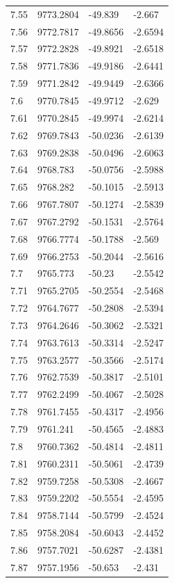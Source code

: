 \begin{table}[H]
\begin{tabular}{llll}
7.55 & 9773.2804 & -49.839 & -2.667 \\
7.56 & 9772.7817 & -49.8656 & -2.6594 \\
7.57 & 9772.2828 & -49.8921 & -2.6518 \\
7.58 & 9771.7836 & -49.9186 & -2.6441 \\
7.59 & 9771.2842 & -49.9449 & -2.6366 \\
7.6 & 9770.7845 & -49.9712 & -2.629 \\
7.61 & 9770.2845 & -49.9974 & -2.6214 \\
7.62 & 9769.7843 & -50.0236 & -2.6139 \\
7.63 & 9769.2838 & -50.0496 & -2.6063 \\
7.64 & 9768.783 & -50.0756 & -2.5988 \\
7.65 & 9768.282 & -50.1015 & -2.5913 \\
7.66 & 9767.7807 & -50.1274 & -2.5839 \\
7.67 & 9767.2792 & -50.1531 & -2.5764 \\
7.68 & 9766.7774 & -50.1788 & -2.569 \\
7.69 & 9766.2753 & -50.2044 & -2.5616 \\
7.7 & 9765.773 & -50.23 & -2.5542 \\
7.71 & 9765.2705 & -50.2554 & -2.5468 \\
7.72 & 9764.7677 & -50.2808 & -2.5394 \\
7.73 & 9764.2646 & -50.3062 & -2.5321 \\
7.74 & 9763.7613 & -50.3314 & -2.5247 \\
7.75 & 9763.2577 & -50.3566 & -2.5174 \\
7.76 & 9762.7539 & -50.3817 & -2.5101 \\
7.77 & 9762.2499 & -50.4067 & -2.5028 \\
7.78 & 9761.7455 & -50.4317 & -2.4956 \\
7.79 & 9761.241 & -50.4565 & -2.4883 \\
7.8 & 9760.7362 & -50.4814 & -2.4811 \\
7.81 & 9760.2311 & -50.5061 & -2.4739 \\
7.82 & 9759.7258 & -50.5308 & -2.4667 \\
7.83 & 9759.2202 & -50.5554 & -2.4595 \\
7.84 & 9758.7144 & -50.5799 & -2.4524 \\
7.85 & 9758.2084 & -50.6043 & -2.4452 \\
7.86 & 9757.7021 & -50.6287 & -2.4381 \\
7.87 & 9757.1956 & -50.653 & -2.431 \\

\end{tabular}
\end{table}
